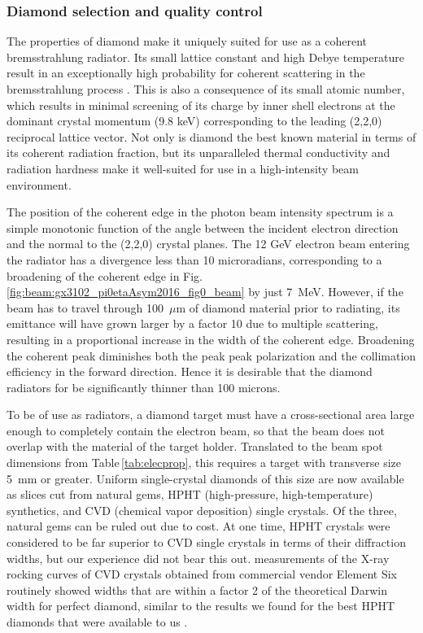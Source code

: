 \subsubsection{Diamond selection and quality control \label{sec:diamonds}}
The properties of diamond make it uniquely suited for use as a coherent brems\-strah\-lung radiator.
Its small lattice constant and high Debye temperature result in an exceptionally high probability
for coherent scattering in the brems\-strah\-lung process \cite{Bilokon:1983}.
This is also a consequence of its small
atomic number, which results in minimal screening of its charge by inner shell electrons at the
dominant crystal momentum (9.8 keV) corresponding to the leading (2,2,0) reciprocal lattice vector.
Not only is diamond the best known material in terms of its coherent radiation
fraction, but its unparalleled thermal conductivity and radiation hardness make it
well-suited for use in a high-intensity beam environment.

The position of the coherent edge in the photon beam intensity spectrum is a simple monotonic
function of the angle between the incident electron direction and the normal to the (2,2,0)
crystal planes. The 12 GeV electron beam entering the radiator has a divergence less than
10 microradians, corresponding to a broadening of the coherent edge in
Fig.\,\ref{fig:beam:gx3102_pi0etaAsym2016_fig0_beam} by just 7~MeV. However, if the beam has 
to travel through 100~$\mu$m of diamond material prior to radiating, its emittance will have
grown larger by a factor 10 due to multiple scattering, resulting in a proportional increase
in the width of the coherent edge. Broadening the coherent peak diminishes both the peak
peak polarization and the collimation efficiency in the forward direction.
Hence it is desirable that the diamond radiators for \GX{} be significantly
thinner than 100 microns. 

To be of use as radiators, a diamond target must have a cross-sectional area large enough to
completely contain the electron beam, so that the beam does not overlap with the material of
the target holder. Translated to the beam spot dimensions from Table\,\ref{tab:elecprop}, this
requires a target with transverse size 5~mm or greater. Uniform single-crystal diamonds of
this size are now available as slices cut from natural gems, HPHT (high-pressure, 
high-temperature) synthetics, and CVD (chemical vapor deposition) single crystals. Of the
three, natural gems can be ruled out due to cost. At one time, HPHT crystals were considered
to be far superior to CVD single crystals in terms of their diffraction widths, but our
experience did not bear this out. \GX{} measurements of the
X-ray rocking curves of CVD crystals obtained from commercial vendor Element Six routinely
showed widths that are within a factor 2 of the theoretical Darwin width for perfect diamond,
similar to the results we found for the best HPHT diamonds that were available to us
\cite{YANG2010719,YANG2012}.


